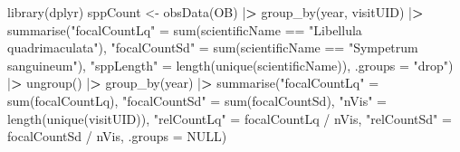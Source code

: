 \documentclass[
  10pt,
]{article}
\newenvironment{Shaded}{\begin{snugshade}}{\end{snugshade}}
\newcommand{\AttributeTok}[1]{\textcolor[rgb]{0.77,0.63,0.00}{#1}}
\newcommand{\ConstantTok}[1]{\textcolor[rgb]{0.00,0.00,0.00}{#1}}
\newcommand{\ErrorTok}[1]{\textcolor[rgb]{0.64,0.00,0.00}{\textbf{#1}}}
\newcommand{\FunctionTok}[1]{\textcolor[rgb]{0.00,0.00,0.00}{#1}}
\newcommand{\NormalTok}[1]{#1}
\newcommand{\OtherTok}[1]{\textcolor[rgb]{0.56,0.35,0.01}{#1}}
\newcommand{\SpecialCharTok}[1]{\textcolor[rgb]{0.00,0.00,0.00}{#1}}
\newcommand{\StringTok}[1]{\textcolor[rgb]{0.31,0.60,0.02}{#1}}
\begin{document}
\begin{Shaded}
\begin{Highlighting}[]
\FunctionTok{library}\NormalTok{(dplyr)}
\NormalTok{sppCount }\OtherTok{\textless{}{-}} \FunctionTok{obsData}\NormalTok{(OB) }\SpecialCharTok{|}\ErrorTok{\textgreater{}} 
    \FunctionTok{group\_by}\NormalTok{(year, visitUID) }\SpecialCharTok{|}\ErrorTok{\textgreater{}} 
    \FunctionTok{summarise}\NormalTok{(}\StringTok{"focalCountLq"} \OtherTok{=} \FunctionTok{sum}\NormalTok{(scientificName }\SpecialCharTok{==} \StringTok{"Libellula quadrimaculata"}\NormalTok{),}
              \StringTok{"focalCountSd"} \OtherTok{=} \FunctionTok{sum}\NormalTok{(scientificName }\SpecialCharTok{==} \StringTok{"Sympetrum sanguineum"}\NormalTok{),}
              \StringTok{"sppLength"} \OtherTok{=} \FunctionTok{length}\NormalTok{(}\FunctionTok{unique}\NormalTok{(scientificName)), }
              \AttributeTok{.groups =} \StringTok{"drop"}\NormalTok{) }\SpecialCharTok{|}\ErrorTok{\textgreater{}} 
    \FunctionTok{ungroup}\NormalTok{() }\SpecialCharTok{|}\ErrorTok{\textgreater{}} 
    \FunctionTok{group\_by}\NormalTok{(year) }\SpecialCharTok{|}\ErrorTok{\textgreater{}} 
    \FunctionTok{summarise}\NormalTok{(}\StringTok{"focalCountLq"} \OtherTok{=} \FunctionTok{sum}\NormalTok{(focalCountLq),}
              \StringTok{"focalCountSd"} \OtherTok{=} \FunctionTok{sum}\NormalTok{(focalCountSd),}
              \StringTok{"nVis"} \OtherTok{=} \FunctionTok{length}\NormalTok{(}\FunctionTok{unique}\NormalTok{(visitUID)),}
              \StringTok{"relCountLq"} \OtherTok{=}\NormalTok{ focalCountLq }\SpecialCharTok{/}\NormalTok{ nVis,}
              \StringTok{"relCountSd"} \OtherTok{=}\NormalTok{ focalCountSd }\SpecialCharTok{/}\NormalTok{ nVis,}
              \AttributeTok{.groups =} \ConstantTok{NULL}\NormalTok{)}


\end{Highlighting}
\end{Shaded}
\end{document}
